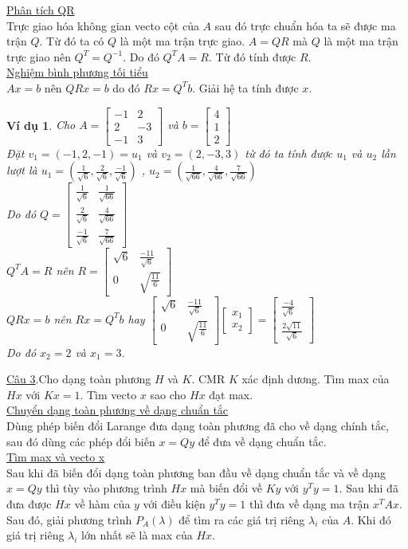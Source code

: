\documentclass[12pt,a4paper]{book}
\newtheorem{vd}{Ví dụ}
\newcommand{\m}[1]{
\begin{bmatrix}
#1
\end{bmatrix}
}
\newcommand{\s}[1]{
\sqrt{#1}
}
\newcommand{\n}[1]{
\left(#1\right)
}
\begin{document}
\underline{Phân tích QR} \\
Trực giao hóa không gian vecto cột của $A$ sau đó trực chuẩn hóa ta sẽ được ma trận $Q$. Từ đó ta có $Q$ là một ma trận trực giao.
$A = QR$ mà $Q$ là một ma trận trực giao nên $Q^{T} = Q^{-1}$. Do đó $Q^{T}A = R$. Từ đó tính được $R$. \\
\underline{Nghiệm bình phương tối tiểu} \\
$Ax = b$ nên $QRx = b$ do đó $Rx = Q^{T}b$. Giải hệ ta tính được $x$.
\begin{vd}
Cho 
$A = \m{
-1 & 2\\
2 & -3\\
-1 & 3
}$ và $b = \m{
4\\
1\\
2
}$ \\
Đặt $v_1 = \n{-1,2,-1} = u_1$ và $v_2 = \n{2,-3,3}$ từ đó ta tính được $u_1$ và $u_2$ lần lượt là $u_1 = \n{\frac{1}{\s{6}},\frac{2}{\s{6}},\frac{-1}{\s{6}}}$ , $u_2 = \n{\frac{1}{\s{66}},\frac{4}{\s{66}},\frac{7}{\s{66}}}$ \\
Do đó $Q = \m{
\frac{1}{\s{6}} & \frac{1}{\s{66}} \\
\frac{2}{\s{6}} & \frac{4}{\s{66}} \\
\frac{-1}{\s{6}} & \frac{7}{\s{66}}
}$ \\
$Q^{T}A = R$ nên $R = \m{
\s{6} & \frac{-11}{\s{6}} \\
0 & \s{\frac{11}{6}}
}$ \\
$QRx = b$ nên $Rx = Q^{T}b$ hay $\m{
\s{6} & \frac{-11}{\s{6}} \\
0 & \s{\frac{11}{6}}
}\m{x_1 \\ x_2} = \m{
\frac{-4}{\s{6}} \\
\frac{2\s{11}}{\s{6}}
}$ \\
Do đó $x_2 = 2$ và $x_1 = 3$.
\end{vd}
\underline{Câu 3}.Cho dạng toàn phương $H$ và $K$. CMR $K$ xác định dương. Tìm max của $Hx$ với $Kx = 1$. Tìm vecto $x$ sao cho $Hx$ đạt max. \\
\underline{Chuyển dạng toàn phương về dạng chuẩn tắc} \\
Dùng phép biến đổi Larange đưa dạng toàn phương đã cho về dạng chính tắc, sau đó dùng các phép đổi biến $x = Qy$ để đưa về dạng chuẩn tắc.\\
\underline{Tìm max và vecto x} \\
Sau khi đã biến đổi dạng toàn phương ban đầu về dạng chuẩn tắc và về dạng $x = Qy$ thì tùy vào phương trình $Hx$ mà biến đổi về $Ky$ với $y^{T}y = 1$. Sau khi đã đưa được $Hx$ về hàm của $y$ với điều kiện $y^{T}y = 1$ thì đưa về dạng ma trận $x^{T}Ax$. Sau đó, giải phương trình $P_{A}\n{\lambda}$ để tìm ra các giá trị riêng $\lambda_{i}$ của $A$. Khi đó giá trị riêng $\lambda_{i}$ lớn nhất sẽ là max của $Hx$. \\
\end{document}
